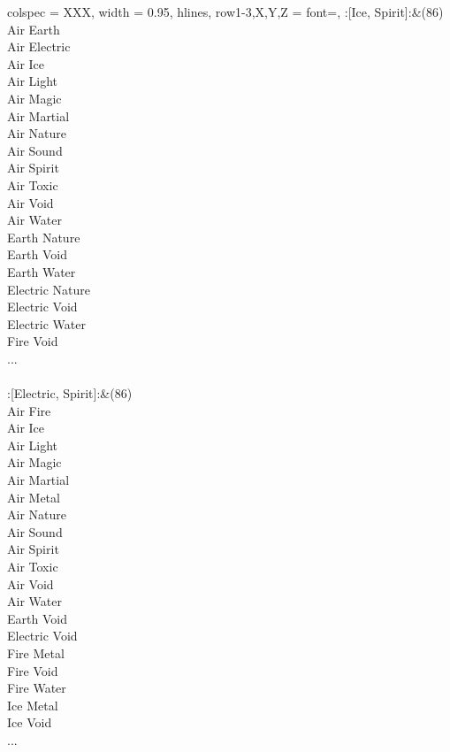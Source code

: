 \begin{longtblr}[
	caption = {2v2 Attacking Effective},
	label = {2v2-Attacking-Effective},
]{
	colspec = {XXX}, width = 0.95\linewidth,
	hlines,
	row{1-3,X,Y,Z} = {font=\bfseries},
}
	:[Ice, Spirit]:&{(86)\\
	Air Earth \\
	Air Electric \\
	Air Ice \\
	Air Light \\
	Air Magic \\
	Air Martial \\
	Air Nature \\
	Air Sound \\
	Air Spirit \\
	Air Toxic \\
	Air Void \\
	Air Water \\
	Earth Nature \\
	Earth Void \\
	Earth Water \\
	Electric Nature \\
	Electric Void \\
	Electric Water \\
	Fire Void \\
	...\\
	}\\

	:[Electric, Spirit]:&{(86)\\
	Air Fire \\
	Air Ice \\
	Air Light \\
	Air Magic \\
	Air Martial \\
	Air Metal \\
	Air Nature \\
	Air Sound \\
	Air Spirit \\
	Air Toxic \\
	Air Void \\
	Air Water \\
	Earth Void \\
	Electric Void \\
	Fire Metal \\
	Fire Void \\
	Fire Water \\
	Ice Metal \\
	Ice Void \\
	...\\
	}\\


\end{longtblr}
